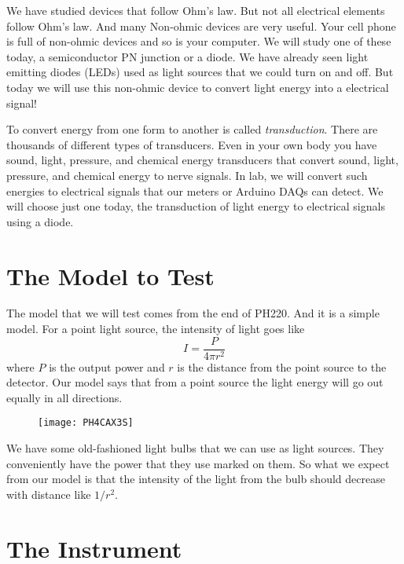 We have studied devices that follow Ohm's law. But not all electrical
elements follow Ohm's law. And many Non-ohmic devices are very useful. Your
cell phone is full of non-ohmic devices and so is your computer. We will
study one of these today, a semiconductor PN junction or a diode. We have
already seen light emitting diodes (LEDs) used as light sources that we
could turn on and off. But today we will use this non-ohmic device to
convert light energy into a electrical signal!

To convert energy from one form to another is called \emph{transduction}.
There are thousands of different types of transducers. Even in your own body
you have sound, light, pressure, and chemical energy transducers that
convert sound, light, pressure, and chemical energy to nerve signals. In
lab, we will convert such energies to electrical signals that our meters or
Arduino DAQs can detect. We will choose just one today, the transduction of
light energy to electrical signals using a diode.

\section{The Model to Test}

The model that we will test comes from the end of PH220. And it is a simple
model. For a point light source, the intensity of light goes like 
\begin{equation*}
I=\frac{P}{4\pi r^{2}}
\end{equation*}%
where $P$ is the output power and $r$ is the distance from the point source
to the detector. Our model says that from a point source the light energy
will go out equally in all directions. \begin{figure}[h!]
\texttt{[image: PH4CAX3S]}
\end{figure}

We have some old-fashioned light bulbs that we can use as light sources.
They conveniently have the power that they use marked on them. So what we
expect from our model is that the intensity of the light from the bulb
should decrease with distance like $1/r^{2}.$

\section{The Instrument}


